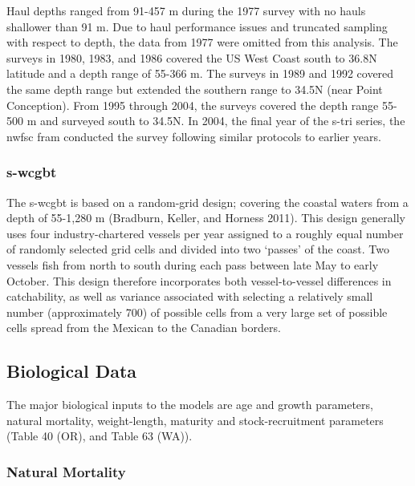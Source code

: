 \documentclass[11pt,
  english,
  letterpaper,
]{article}
\begin{document}
Haul depths ranged from 91-457 m during the 1977 survey with no hauls shallower than 91 m. Due to haul performance issues and truncated sampling with respect to depth, the data from 1977 were omitted from this analysis. The surveys in 1980, 1983, and 1986 covered the US West Coast south to 36.8\textdegree N latitude and a depth range of 55-366 m. The surveys in 1989 and 1992 covered the same depth range but extended the southern range to 34.5\textdegree N (near Point Conception). From 1995 through 2004, the surveys covered the depth range 55-500 m and surveyed south to 34.5\textdegree N. In 2004, the final year of the \gls{s-tri} series, the \gls{nwfsc} \gls{fram} conducted the survey following similar protocols to earlier years.

\hypertarget{section-3}{%
\subsubsection{\texorpdfstring{\acrlong{s-wcgbt}}{}}\label{section-3}}

The \Gls{s-wcgbt} is based on a random-grid design; covering the coastal waters from a depth of 55-1,280 m (Bradburn, Keller, and Horness 2011). This design generally uses four industry-chartered vessels per year assigned to a roughly equal number of randomly selected grid cells and divided into two `passes' of the coast. Two vessels fish from north to south during each pass between late May to early October. This design therefore incorporates both vessel-to-vessel differences in catchability, as well as variance associated with selecting a relatively small number (approximately 700) of possible cells from a very large set of possible cells spread from the Mexican to the Canadian borders.

\hypertarget{biological-data}{%
\subsection{Biological Data}\label{biological-data}}

The major biological inputs to the models are age and growth parameters, natural mortality, weight-length, maturity and stock-recruitment parameters (Table 40 (OR), and Table 63 (WA)).

\hypertarget{natural-mortality}{%
\subsubsection{Natural Mortality}\label{natural-mortality}}
\end{document}
